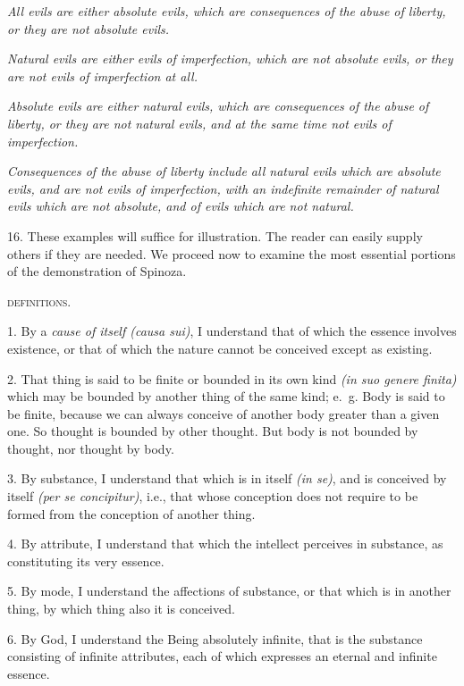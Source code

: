 \documentclass[oneside]{book}
\begin{document}
\emph{All evils are either absolute evils, which are consequences of the
abuse of liberty, or they are not absolute evils.}

\emph{Natural evils are either evils of imperfection, which are not absolute evils, or they are not evils of imperfection at all.}

\emph{Absolute evils are either natural evils, which are consequences of
the abuse of liberty, or they are not natural evils, and at the same
time not evils of imperfection.}

\emph{Consequences of the abuse of liberty include all natural evils
which are absolute evils, and are not evils of imperfection, with an
indefinite remainder of natural evils which are not absolute, and of
evils which are not natural.}

16. These examples will suffice for illustration. The reader
can easily supply others if they are needed. We proceed now to
examine the most essential portions of the demonstration of
Spinoza.

\begin{center}\textsc{definitions.}\end{center}

1. By a \emph{cause of itself (causa sui)}, I understand that of which
the essence involves existence, or that of which the nature cannot be conceived except as existing.

2. That thing is said to be finite or bounded in its own kind
\emph{(in suo genere finita)} which may be bounded by another thing of
the same kind; e.~g. Body is said to be finite, because we can
always conceive of another body greater than a given one. So
thought is bounded by other thought. But body is not bounded
by thought, nor thought by body.

3. By substance, I understand that which is in itself \emph{(in se)},
and is conceived by itself \emph{(per se concipitur)}, i.e., that whose
conception does not require to be formed from the conception of
another thing.

4. By attribute, I understand that which the intellect perceives in
substance, as constituting its very essence.

5. By mode, I understand the affections of substance, or that
which is in another thing, by which thing also it is conceived.

6. By God, I understand the Being absolutely infinite, that
is the substance consisting of infinite attributes, each of which
expresses an eternal and infinite essence.
\end{document}
